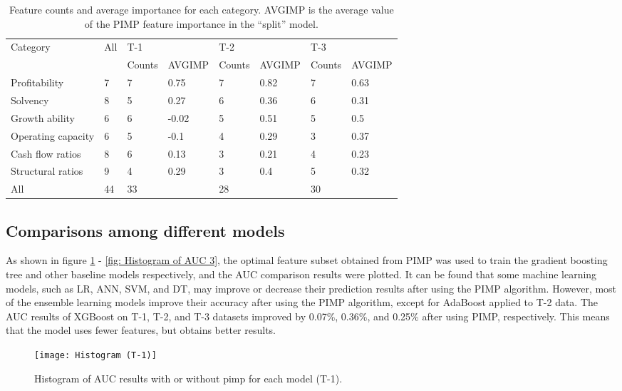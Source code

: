 \documentclass[review]{elsarticle}
\begin{document}
\begin{table}[H]
    \centering
    \caption{Feature counts and average importance for each category. AVGIMP is the average value of the PIMP feature importance in the ``split'' model.}
    \label{table: company ability}
    \begin{tabular}{llllllll}
    \hline
    \multirow{2}{*}{Category} & \multirow{2}{*}{All} & \multicolumn{2}{l}{T-1} & \multicolumn{2}{l}{T-2} & \multicolumn{2}{l}{T-3} \\ \cline{3-8}
     &  & Counts & AVGIMP & Counts & AVGIMP& Counts & AVGIMP \\ \hline
    Profitability & 7 & 7 & 0.75 & 7 & 0.82 & 7 & 0.63 \\
    Solvency & 8 & 5 & 0.27 & 6 & 0.36 & 6 & 0.31 \\
    Growth ability & 6 & 6 & -0.02 & 5 & 0.51 & 5 & 0.5 \\
    Operating capacity & 6 & 5 & -0.1 & 4 & 0.29 & 3 & 0.37 \\
    Cash flow ratios & 8 & 6 & 0.13 & 3 & 0.21 & 4 & 0.23 \\
    Structural ratios & 9 & 4 & 0.29 & 3 & 0.4 & 5 & 0.32 \\
    All & 44 & 33 &  & 28 &  & 30 &  \\ \hline
    \end{tabular}
    \end{table}

\subsection{Comparisons among different models}
As shown in figure \ref{fig: Histogram of AUC 1} - \ref{fig: Histogram of AUC 3}, the optimal feature subset obtained from PIMP was used to train the gradient boosting tree and other baseline models respectively, and the AUC comparison results were plotted. It can be found that some machine learning models, such as LR, ANN, SVM, and DT, may improve or decrease their prediction results after using the PIMP algorithm. However, most of the ensemble learning models improve their accuracy after using the PIMP algorithm, except for AdaBoost applied to T-2 data. The AUC results of XGBoost on T-1, T-2, and T-3 datasets improved by 0.07\%, 0.36\%, and 0.25\% after using PIMP, respectively. This means that the model uses fewer features, but obtains better results.

\begin{figure}[H]
    \centering
    \texttt{[image: Histogram (T-1)]}
    \caption{Histogram of AUC results with or without pimp for each model (T-1).}
    \label{fig: Histogram of AUC 1}
\end{figure}
\end{document}

